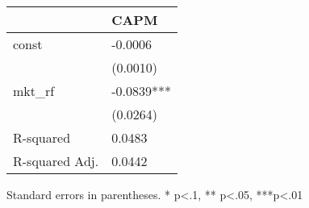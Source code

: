 \begin{table}
\caption{}
\label{}
\begin{center}
\begin{tabular}{ll}
\hline
               & CAPM        \\
\hline
const          & -0.0006     \\
               & (0.0010)    \\
mkt\_rf        & -0.0839***  \\
               & (0.0264)    \\
R-squared      & 0.0483      \\
R-squared Adj. & 0.0442      \\
\hline
\end{tabular}
\end{center}
\end{table}
\bigskip
Standard errors in parentheses. \newline 
* p<.1, ** p<.05, ***p<.01
